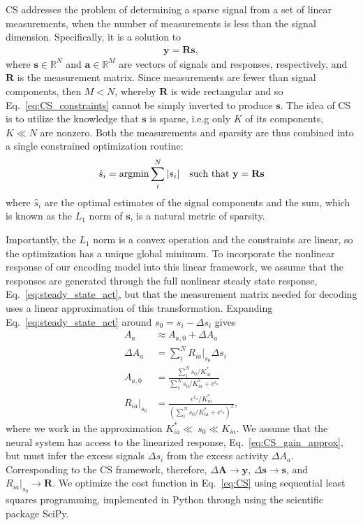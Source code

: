CS addresses the problem of determining a sparse signal from a set of linear measurements, when the number of measurements is less than the signal dimension. Specifically, it is a solution to 
\begin{align}
\mathbf y = \mathbf R\mathbf s,
\label{eq:CS_constraints}
\end{align} where $\mathbf s \in \mathbb{R}^N$ and $\mathbf a\in \mathbb{R}^M$ are vectors of signals and responses, respectively, and $\mathbf R$ is the measurement matrix. Since measurements are fewer than signal components, then $M < N$, whereby $\mathbf R$ is wide rectangular and so Eq.~\ref{eq:CS_constraints} cannot be simply inverted to produce $\mathbf s$. The idea of CS is to utilize the knowledge that $\mathbf s$ is sparse, i.e.g only $K$ of its components, $K \ll N$ are nonzero. Both the measurements and sparsity are thus combined into a single constrained optimization routine:
\begin{align}
\hat s_i = \textup{argmin} \sum_i^N |s_i| \quad \textup{such that } \mathbf y = \mathbf R\mathbf s
\label{eq:CS}
\end{align}
where $\hat s_i$ are the optimal estimates of the signal components and the sum, which is known as the $L_1$ norm of $\mathbf s$, is a natural metric of sparsity. 

Importantly, the $L_1$ norm is a convex operation and the constraints are linear, so the optimization has a unique global minimum. To incorporate the nonlinear response of our encoding model into this linear framework, we assume that the responses are generated through the full nonlinear steady state response, Eq.~\ref{eq:steady_state_act}, but that the measurement matrix needed for decoding uses a linear approximation of this transformation.  Expanding Eq.~\ref{eq:steady_state_act} around $s_0 = s_i - \Delta s_i$ gives
\begin{align}
A_a &\approx A_{a, 0} + \Delta A_a \label{eq:CS_act_approx} \\
\Delta A_a &= \sum_i^NR_{ia}\big|_{s_0}\Delta s_i \label{eq:CS_dAct_approx}\\
A_{a, 0} &= \frac{\sum_1^N s_0/K_{ia}^*}{\sum_1^N s_0/K_{ia}^* + e^{\epsilon_a}} \label{eq:CS_act0_approx} \\
R_{ia}\big|_{s_0} &=  \frac{e^{\epsilon_a}/K_{ia}^*}{(\sum_i^Ns_0/K_{ia}^* + e^{\epsilon_a})^2},
\label{eq:CS_gain_approx}
\end{align}
where we work in the approximation $K^*_{ia} \ll~s_0 \ll K_{ia}$. We assume that the neural system has access to the linearized response, Eq.~\ref{eq:CS_gain_approx}, but must infer the excess signals $\Delta s_i$ from the excess activity $\Delta A_a$. Corresponding to the CS framework, therefore, $\Delta \mathbf {A} \rightarrow \mathbf y$, $\Delta \mathbf s \rightarrow \mathbf s$, and $R_{ia}\big|_{s_0} \rightarrow \mathbf R$. We optimize the cost function in Eq.~\ref{eq:CS} using sequential least squares programming, implemented in Python through using the scientific package SciPy.

